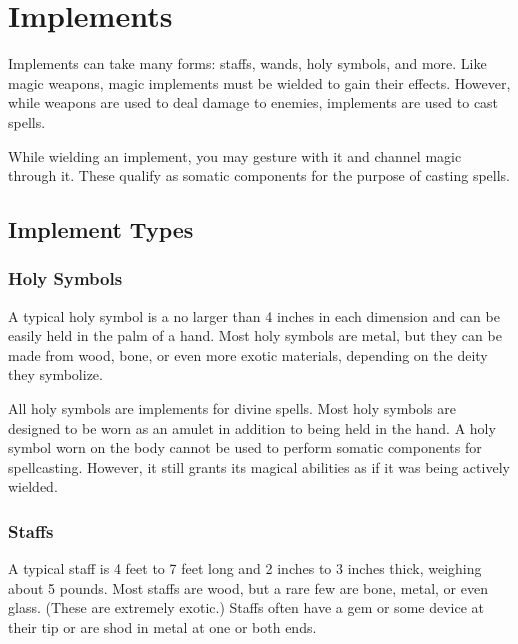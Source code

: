         

        

\section{Implements}

    Implements can take many forms: staffs, wands, holy symbols, and more.
    Like magic weapons, magic implements must be wielded to gain their effects.
    However, while weapons are used to deal damage to enemies, implements are used to cast spells.

     While wielding an implement, you may gesture with it and channel magic through it.
    These qualify as somatic components for the purpose of casting spells.

    \subsection{Implement Types}

        \subsubsection{Holy Symbols}

             A typical holy symbol is a no larger than 4 inches in each dimension and can be easily held in the palm of a hand.
            Most holy symbols are metal, but they can be made from wood, bone, or even more exotic materials, depending on the deity they symbolize.

             All holy symbols are implements for divine spells.
            Most holy symbols are designed to be worn as an amulet in addition to being held in the hand.
            A holy symbol worn on the body cannot be used to perform somatic components for spellcasting.
            However, it still grants its magical abilities as if it was being actively wielded.

        \subsubsection{Staffs}

             A typical staff is 4 feet to 7 feet long and 2 inches to 3 inches thick, weighing about 5 pounds.
            Most staffs are wood, but a rare few are bone, metal, or even glass.
            (These are extremely exotic.)
            Staffs often have a gem or some device at their tip or are shod in metal at one or both ends.

